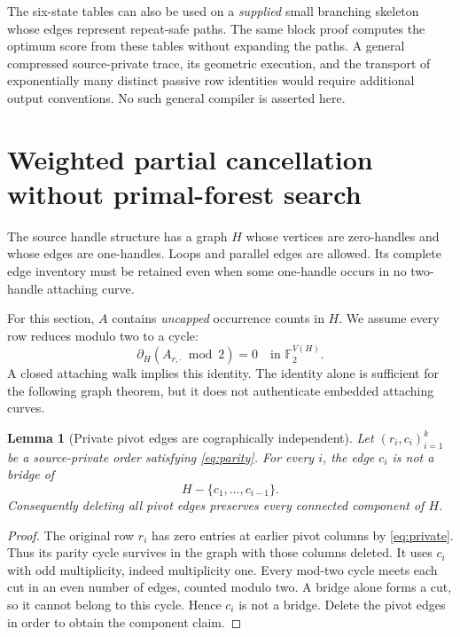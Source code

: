 \documentclass[11pt,letterpaper]{article}
\newtheorem{lemma}[lemma]{Lemma}\aliascntresetthe{lemma}
\theoremstyle{definition}
\theoremstyle{remark}
\newcommand{\FF}{\mathbb F}
\begin{document}
The six-state tables can also be used on a \emph{supplied} small branching skeleton whose edges represent repeat-safe paths. The same block proof computes the optimum score from these tables without expanding the paths. A general compressed source-private trace, its geometric execution, and the transport of exponentially many distinct passive row identities would require additional output conventions. No such general compiler is asserted here.

\section{Weighted partial cancellation without primal-forest search}
\label{sec:forests}

The source handle structure has a graph $H$ whose vertices are zero-handles and whose edges are one-handles. Loops and parallel edges are allowed. Its complete edge inventory must be retained even when some one-handle occurs in no two-handle attaching curve.

For this section, $A$ contains \emph{uncapped} occurrence counts in $H$. We assume every row reduces modulo two to a cycle:
\begin{equation}
 \partial_H(A_{r,\cdot}\bmod2)=0\quad\text{in }\FF_2^{V(H)}.
 \label{eq:parity}
\end{equation}
A closed attaching walk implies this identity. The identity alone is sufficient for the following graph theorem, but it does not authenticate embedded attaching curves.

\begin{lemma}[Private pivot edges are cographically independent]
\label{lem:coforest}
Let $(r_i,c_i)_{i=1}^k$ be a source-private order satisfying \cref{eq:parity}. For every $i$, the edge $c_i$ is not a bridge of
\[
 H-\{c_1,\ldots,c_{i-1}\}.
\]
Consequently deleting all pivot edges preserves every connected component of $H$.
\end{lemma}
\begin{proof}
The original row $r_i$ has zero entries at earlier pivot columns by \cref{eq:private}. Thus its parity cycle survives in the graph with those columns deleted. It uses $c_i$ with odd multiplicity, indeed multiplicity one. Every mod-two cycle meets each cut in an even number of edges, counted modulo two. A bridge alone forms a cut, so it cannot belong to this cycle. Hence $c_i$ is not a bridge. Delete the pivot edges in order to obtain the component claim.
\end{proof}
\end{document}
